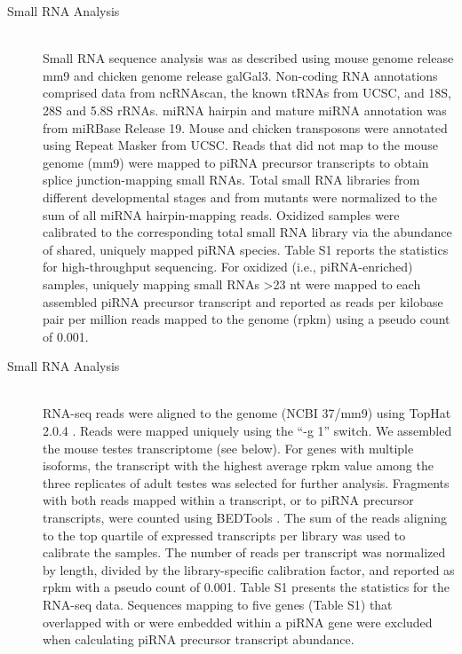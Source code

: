 \begin{description}
    \item[Small RNA Analysis] \hfill \\
    Small RNA sequence analysis was as described \citep{Li2009a} using mouse genome release mm9 and chicken genome release galGal3. Non-coding RNA annotations comprised data from ncRNAscan, the known tRNAs from UCSC, and 18S, 28S and 5.8S rRNAs. miRNA hairpin and mature miRNA annotation was from miRBase Release 19. Mouse and chicken transposons were annotated using Repeat Masker from UCSC. Reads that did not map to the mouse genome (mm9) were mapped to piRNA precursor transcripts to obtain splice junction-mapping small RNAs. Total small RNA libraries from different developmental stages and from mutants were normalized to the sum of all miRNA hairpin-mapping reads. Oxidized samples were calibrated to the corresponding total small RNA library via the abundance of shared, uniquely mapped piRNA species. Table S1 reports the statistics for high-throughput sequencing. For oxidized (i.e., piRNA-enriched) samples, uniquely mapping small RNAs >23 nt were mapped to each assembled piRNA precursor transcript and reported as reads per kilobase pair per million reads mapped to the genome (rpkm) using a pseudo count of 0.001.

    \item[Small RNA Analysis] \hfill \\
    RNA-seq reads were aligned to the genome (NCBI 37/mm9) using TopHat 2.0.4 \citep{Trapnell2009}. Reads were mapped uniquely using the ``-g 1'' switch. We assembled the mouse testes transcriptome (see below). For genes with multiple isoforms, the transcript with the highest average rpkm value among the three replicates of adult testes was selected for further analysis. Fragments with both reads mapped within a transcript, or to piRNA precursor transcripts, were counted using BEDTools \citep{Quinlan2010}. The sum of the reads aligning to the top quartile of expressed transcripts per library was used to calibrate the samples. The number of reads per transcript was normalized by length, divided by the library-specific calibration factor, and reported as rpkm with a pseudo count of 0.001. Table S1 presents the statistics for the RNA-seq data. Sequences mapping to five genes (Table S1) that overlapped with or were embedded within a piRNA gene were excluded when calculating piRNA precursor transcript abundance.


\end{description}
